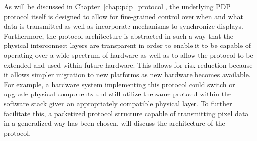     As will be discussed in Chapter~\ref{chap:pdp_protocol}, the underlying PDP protocol itself is designed to allow for fine-grained control over when and what data is transmitted as well as incorporate mechanisms to synchronize displays. Furthermore, the protocol architecture is abstracted in such a way that the physical interconnect layers are transparent in order to enable it to be capable of operating over a wide-spectrum of hardware as well as to allow the protocol to be extended and used within future hardware. This allows for risk reduction because it allows simpler migration to new platforms as new hardware becomes available. For example, a hardware system implementing this protocol could switch or upgrade physical components and still utilize the same protocol within the software stack given an appropriately compatible physical layer. To further facilitate this, a packetized protocol structure capable of transmitting pixel data in a generalized way has been chosen. will discuss the architecture of the protocol.
